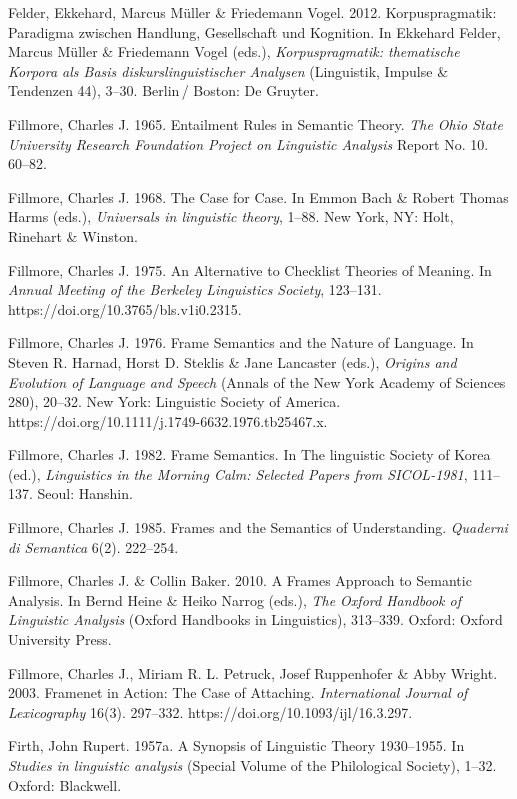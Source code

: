 Felder, Ekkehard, Marcus Müller \& Friedemann Vogel. 2012. Korpuspragmatik: Paradigma zwischen Handlung, Gesellschaft und Kognition. In Ekkehard Felder, Marcus Müller \& Friedemann Vogel (eds.), \emph{Korpuspragmatik: thematische Korpora als Basis diskurslinguistischer Analysen} (Linguistik, Impulse \& Tendenzen 44), 3--30. Berlin\,/ Boston: De Gruyter.

Fillmore, Charles J. 1965. Entailment Rules in Semantic Theory. \emph{The Ohio State University Research Foundation Project on Linguistic Analysis} Report No. 10. 60--82.

Fillmore, Charles J. 1968. The Case for Case. In Emmon Bach \& Robert Thomas Harms (eds.), \emph{Universals in linguistic theory}, 1--88. New York, NY: Holt, Rinehart \& Winston.

Fillmore, Charles J. 1975. An Alternative to Checklist Theories of Meaning. In \emph{Annual Meeting of the Berkeley Linguistics Society}, 123--131. https://doi.org/10.3765/bls.v1i0.2315.

Fillmore, Charles J. 1976. Frame Semantics and the Nature of Language. In Steven R. Harnad, Horst D. Steklis \& Jane Lancaster (eds.), \emph{Origins and Evolution of Language and Speech} (Annals of the New York Academy of Sciences 280), 20--32. New York: Linguistic Society of America. https://doi.org/10.1111/j.1749-6632.1976.tb25467.x.

Fillmore, Charles J. 1982. Frame Semantics. In The linguistic Society of Korea (ed.), \emph{Linguistics in the Morning Calm: Selected Papers from SICOL-1981}, 111--137. Seoul: Hanshin.

Fillmore, Charles J. 1985. Frames and the Semantics of Understanding. \emph{Quaderni di Semantica} 6(2). 222--254.

Fillmore, Charles J. \& Collin Baker. 2010. A Frames Approach to Semantic Analysis. In Bernd Heine \& Heiko Narrog (eds.), \emph{The Oxford Handbook of Linguistic Analysis} (Oxford Handbooks in Linguistics), 313--339. Oxford: Oxford University Press.

Fillmore, Charles J., Miriam R. L. Petruck, Josef Ruppenhofer \& Abby Wright. 2003. Framenet in Action: The Case of Attaching. \emph{International Journal of Lexicography} 16(3). 297--332. https://doi.org/10.1093/ijl/16.3.297.

Firth, John Rupert. 1957a. A Synopsis of Linguistic Theory 1930--1955. In \emph{Studies in linguistic analysis} (Special Volume of the Philological Society), 1--32. Oxford: Blackwell.

